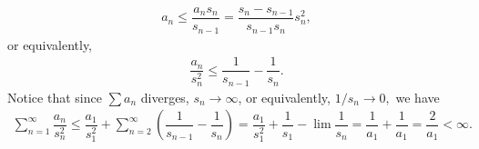 \begin{problem}
\begin{solution}
\begin{itemize}
\begin{align*}
    a_n\le \dfrac{a_ns_n}{s_{n-1}}=\dfrac{s_n-s_{n-1}}{s_{n-1}s_n}s_n^2,
\end{align*}
or equivalently,
\begin{align*}
    \dfrac{a_n}{s_n^2}\le \dfrac{1}{s_{n-1}}-\dfrac{1}{s_{n}}.
\end{align*}
Notice that since $\sum a_n$ diverges, $s_n\rightarrow \infty$, or equivalently, $1/s_n\rightarrow0,$ we have 
\begin{align*}
    \sum_{n=1}^\infty \dfrac{a_n}{s_n^2}\le \dfrac{a_1}{s_1^2}+ \sum_{n=2}^\infty(\dfrac{1}{s_{n-1}}-\dfrac{1}{s_{n}})=\dfrac{a_1}{s_1^2}+\dfrac{1}{s_1}-\lim\dfrac{1}{s_n}=\dfrac{1}{a_1}+\dfrac{1}{a_1}=\dfrac{2}{a_1}<\infty.
\end{align*}
\end{itemize}
\end{solution}
\end{problem}

